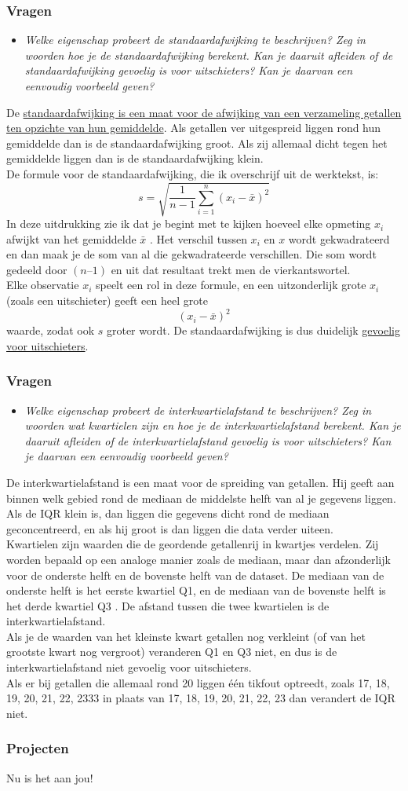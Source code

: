 \documentclass[dutch]{beamer}
\newcommand{\vraag}[1]{\begin{itemize}\item[Vraag:] {\it #1}\end{itemize}}
\begin{document}
\begin{frame}
\frametitle{Vragen}
\vraag{Welke eigenschap probeert de standaardafwijking te beschrijven? Zeg in woorden hoe je de standaardafwijking berekent. Kan je daaruit afleiden of de standaardafwijking gevoelig is voor uitschieters? Kan je daarvan een eenvoudig voorbeeld geven?}
\pause
{\scriptsize
De \uline{standaardafwijking is een maat voor de afwijking van een verzameling getallen ten opzichte van hun gemiddelde}. Als getallen ver uitgespreid liggen rond hun gemiddelde dan is de standaardafwijking groot. Als zij allemaal dicht tegen het gemiddelde liggen dan is de standaardafwijking klein.\\
De formule voor de standaardafwijking, die ik overschrijf uit de werktekst, is:
$$
s = \sqrt{\frac{1}{n-1}\sum^n_{i=1}(x_i - \bar{x})^2}
$$
In deze uitdrukking zie ik dat je begint met te kijken hoeveel elke opmeting $x_i$ afwijkt van het
gemiddelde $\bar{x}$ . Het verschil tussen $x_i$ en $x$ wordt gekwadrateerd en dan maak je de som van
al die gekwadrateerde verschillen. Die som wordt gedeeld door $(n–1)$ en uit dat resultaat
trekt men de vierkantswortel.\\
Elke observatie $x_i$ speelt een rol in deze formule, en een uitzonderlijk grote $x_i$ (zoals een
uitschieter) geeft een heel grote
$$
(x_i - \bar{x})^2
$$
waarde, zodat ook $s$ groter wordt. De standaardafwijking is dus duidelijk \uline{gevoelig voor uitschieters}.
}
\end{frame}

\begin{frame}
\frametitle{Vragen}
\vraag{Welke eigenschap probeert de interkwartielafstand te beschrijven? Zeg in woorden wat kwartielen zijn en hoe je de interkwartielafstand berekent. Kan je daaruit afleiden of de interkwartielafstand gevoelig is voor uitschieters? Kan je daarvan een eenvoudig voorbeeld geven?}
\pause
{\scriptsize
De interkwartielafstand is een maat voor de spreiding van getallen. Hij geeft aan binnen welk gebied rond de mediaan de middelste helft van al je gegevens liggen. Als de IQR klein is, dan liggen die gegevens dicht rond de mediaan geconcentreerd, en als hij groot is dan liggen die data verder uiteen.\\
Kwartielen zijn waarden die de geordende getallenrij in kwartjes verdelen. Zij worden bepaald op een analoge manier zoals de mediaan, maar dan afzonderlijk voor de onderste helft en de bovenste helft van de dataset. De mediaan van de onderste helft is het eerste kwartiel Q1, en de mediaan van de bovenste helft is het derde kwartiel Q3 . De afstand tussen die twee kwartielen is de interkwartielafstand.\\
Als je de waarden van het kleinste kwart getallen nog verkleint (of van het grootste kwart nog vergroot) veranderen Q1 en Q3 niet, en dus is de interkwartielafstand niet gevoelig voor uitschieters.\\
Als er bij getallen die allemaal rond 20 liggen één tikfout optreedt, zoals 17, 18, 19, 20, 21,
22, 2333 in plaats van 17, 18, 19, 20, 21, 22, 23 dan verandert de IQR niet.
}
\end{frame}

\begin{frame}
\frametitle{Projecten}

\begin{center}
{\Huge Nu is het aan jou!}
\end{center}

\end{frame}
\end{document}
